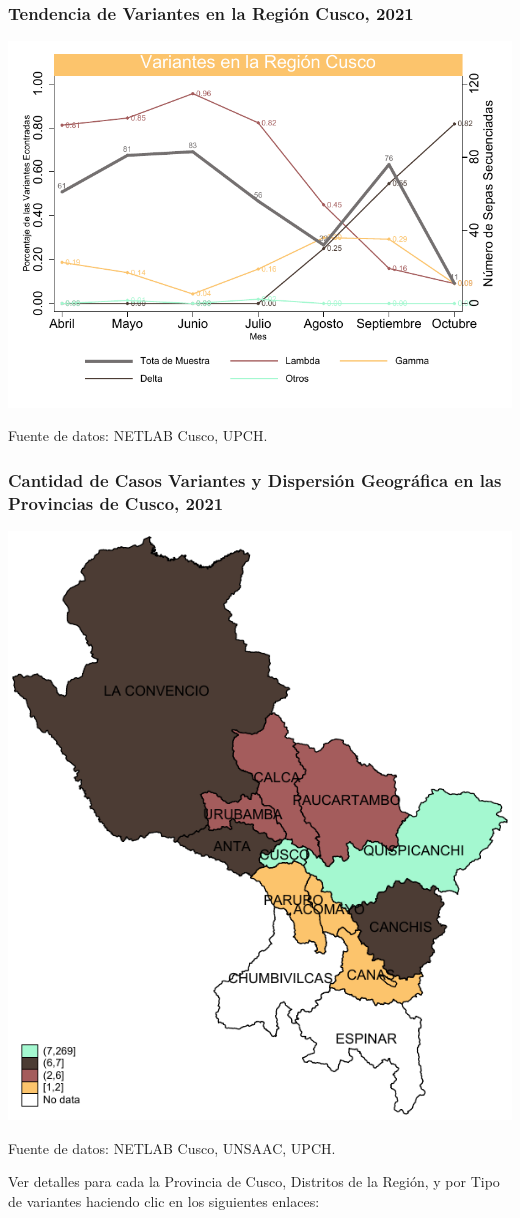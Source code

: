 \documentclass[xcolor=table]{beamer}
\begin{document}
	\begin{frame}[label=variantes]
	\frametitle{Tendencia de Variantes en la Región Cusco, 2021}
	\vspace{-.5cm}
	\begin{center}
		\includegraphics[width=0.9\linewidth]{../figuras/variantes.pdf}
	\end{center}
	{\tiny Fuente de datos: NETLAB Cusco, UPCH.}
	\end{frame}

	\begin{frame}[label=mapa_variantes]
	\frametitle{Cantidad de Casos Variantes y Dispersión Geográfica en las Provincias de Cusco, 2021}
	\begin{center}
		\includegraphics[width=0.4\linewidth]{../figuras/variantes_provincial.pdf}
	\end{center}
	{\tiny Fuente de datos: NETLAB Cusco, UNSAAC, UPCH.}
	
	Ver detalles para cada la Provincia de Cusco, Distritos de la Región, y por Tipo de variantes haciendo clic en los siguientes enlaces:
	\hyperlink{mapa_provincia_cusco}{} \hyperlink{mapa_distrital}{} \hyperlink{mapa_lambda}{}
	\hyperlink{mapa_gamma}{}
	\hyperlink{mapa_delta}{}
\end{frame}
\end{document}
